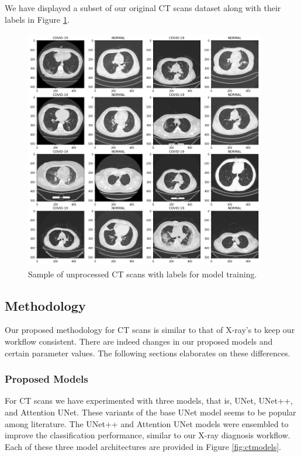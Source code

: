 We have displayed a subset of our original CT scans dataset along with their labels in Figure \ref{fig:ct data}.


\begin{figure}[H]
	\centering
	\includegraphics[width=10.5cm, height=10.5cm]{Images/CTScansDist.png}
	\caption{\small Sample of unprocessed CT scans with labels for model training.}
	\label{fig:ct data}
\end{figure}

\subsection{Methodology}

Our proposed methodology for CT scans is similar to that of X-ray's to keep our workflow consistent. There are indeed changes in our proposed models and certain parameter values. The following sections elaborates on these differences. 
\subsubsection{Proposed Models}

For CT scans we have experimented with three models, that is, UNet, UNet++, and Attention UNet. These variants of the base UNet model seems to be popular among literature. The UNet++ and Attention UNet models were ensembled to improve the classification performance, similar to our X-ray diagnosis workflow. Each of these three model architectures are provided in Figure \ref{fig:ctmodels}.

